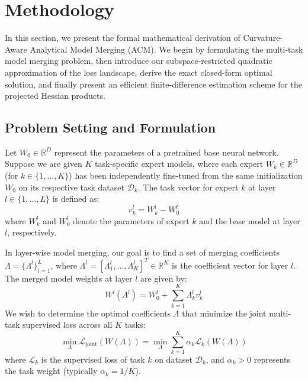 \section{Methodology}
\label{sec:method}

In this section, we present the formal mathematical derivation of Curvature-Aware Analytical Model Merging (ACM). We begin by formulating the multi-task model merging problem, then introduce our subspace-restricted quadratic approximation of the loss landscape, derive the exact closed-form optimal solution, and finally present an efficient finite-difference estimation scheme for the projected Hessian products.

\subsection{Problem Setting and Formulation}
Let $W_0 \in \mathbb{R}^D$ represent the parameters of a pretrained base neural network. Suppose we are given $K$ task-specific expert models, where each expert $W_k \in \mathbb{R}^D$ (for $k \in \{1, \dots, K\}$) has been independently fine-tuned from the same initialization $W_0$ on its respective task dataset $\mathcal{D}_k$. The task vector for expert $k$ at layer $l \in \{1, \dots, L\}$ is defined as:
\begin{equation}
    v_k^l = W_k^l - W_0^l
\end{equation}
where $W_k^l$ and $W_0^l$ denote the parameters of expert $k$ and the base model at layer $l$, respectively.

In layer-wise model merging, our goal is to find a set of merging coefficients $\Lambda = \{\Lambda^l\}_{l=1}^L$, where $\Lambda^l = [\Lambda_1^l, \dots, \Lambda_K^l]^T \in \mathbb{R}^K$ is the coefficient vector for layer $l$. The merged model weights at layer $l$ are given by:
\begin{equation}
    W^l(\Lambda^l) = W_0^l + \sum_{k=1}^K \Lambda_k^l v_k^l
\end{equation}
We wish to determine the optimal coefficients $\Lambda$ that minimize the joint multi-task supervised loss across all $K$ tasks:
\begin{equation}
    \min_{\Lambda} \mathcal{L}_{\text{joint}}(W(\Lambda)) = \min_{\Lambda} \sum_{k=1}^K \alpha_k \mathcal{L}_k(W(\Lambda))
\end{equation}
where $\mathcal{L}_k$ is the supervised loss of task $k$ on dataset $\mathcal{D}_k$, and $\alpha_k > 0$ represents the task weight (typically $\alpha_k = 1/K$).


